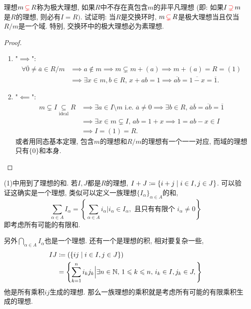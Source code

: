 \documentclass{../solutions-cn}
\begin{document}
\begin{exercise}[习题2.1.6]
    理想$m \,\textcolor{red}{\subsetneq}\, R$称为极大理想, 如果$R$中不存在真包含$m$的非平凡理想
(即: 如果$I \,\textcolor{red}{\supsetneq}\, m$是$R$的理想, 则必有$I = R)$. 试证明: 当$R$是交换环时, 
$m \,\textcolor{red}{\subsetneq}\, R$是极大理想当且仅当$R/m$是一个域. 特别, 交换环中的极大理想必为素理想.
\end{exercise}

\begin{proof}
    \begin{enumerate}[(1)]
        \item "$\implies$":
        \[
        \begin{aligned}
            \forall \overline{0} \neq \overline{a} \in R/m &\implies a \notin m \implies m \subsetneq m + (a) \implies m + (a) = R = (1)\\
            &\implies \exists x \in m, b \in R,\, x + ab = 1 \implies \overline{ab} = \overline{1 - x} = \overline{1}.
        \end{aligned}
        \]
        \item "$\impliedby$":
        \[
        \begin{aligned}
            m \subsetneq I \underset{\text{ideal}}{\subseteq} R &\implies \exists a \in I \setminus m \text{ i.e. } \overline{a} \neq 0 \implies \exists b \in R,\, \overline{a}\overline{b} = \overline{ab} = \overline{1}\\
            &\implies \exists x \in m \subsetneq I,\, ab = 1 + x \implies 1 = ab - x \in I \\
            &\implies I = (1) = R.
        \end{aligned}
        \]
        或者用同态基本定理, 包含$m$的理想和$R/m$的理想有一个一一对应, 而域的理想只有$\{0\}$和本身.
    \end{enumerate}
\end{proof}

\begin{remark}
     (1)中用到了理想的和. 若$I, J$都是$R$的理想, $I + J \mathrel{\coloneqq} \{i + j \mid i \in I, j \in J\}$. 可以验证这确实是一个理想, 类似可以定义一族理想$\{I_\alpha\}_{\alpha \in A}$的和,
    \[
        \sum_{\alpha \in A} I_\alpha = \left\{\sum_{\alpha \in A} i_\alpha \Big|i_\alpha \in I_\alpha, \text{ 且只有有限个 } i_\alpha \neq 0 \right\} 
    \]
    即考虑所有可能的有限和.
    
        另外$\bigcap_{\alpha \in A} I_\alpha$也是一个理想. 还有一个是理想的积, 相对要复杂一些,
    \[
    \begin{aligned}
        IJ &\mathrel{\coloneqq} (\{ij \mid i \in I, j \in J\})\\
        &= \left\{\sum_{k = 1}^{n} i_kj_k \Big| \exists n \in \mathbb{N},\, 1 \leqslant k \leqslant n,\, i_k \in I, j_k \in J, \right\}
    \end{aligned}  
    \]
    他是所有乘积$ij$生成的理想. 那么一族理想的乘积就是考虑所有可能的有限乘积生成的理想.
\end{remark}
\end{document}
